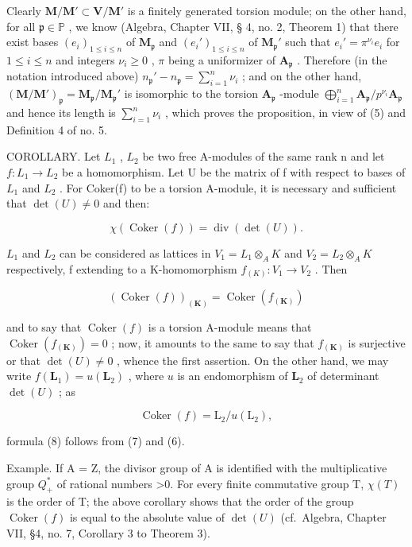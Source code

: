 Clearly \(\mathbf{M} / \mathbf{M}' \subset \mathbf{V} / \mathbf{M}'\) is a finitely generated torsion module; on the other hand, for all \(\mathfrak{p} \in \mathbb{P}\) , we know (Algebra, Chapter VII, § 4, no. 2, Theorem 1) that there exist bases \((e_i)_{1 \leqslant i \leqslant n}\) of \(\mathbf{M}_{\mathfrak{p}}\) and \((e_i')_{1 \leqslant i \leqslant n}\) of \(\mathbf{M}_{\mathfrak{p}}'\) such that \(e_i' = \pi^{\nu_i} e_i\) for \(1 \leqslant i \leqslant n\) and integers \(\nu_i \geqslant 0\) , \(\pi\) being a uniformizer of \(\mathbf{A}_{\mathfrak{p}}\) . Therefore (in the notation introduced above) \(n_{\mathfrak{p}}' - n_{\mathfrak{p}} = \sum_{i=1}^{n} \nu_i\) ; and on the other hand, \((\mathbf{M} / \mathbf{M}')_{\mathfrak{p}} = \mathbf{M}_{\mathfrak{p}} / \mathbf{M}_{\mathfrak{p}}'\) is isomorphic to the torsion \(\mathbf{A}_{\mathfrak{p}}\) -module \(\bigoplus_{i=1}^{n} \mathbf{A}_{\mathfrak{p}} / p^{\nu_i} \mathbf{A}_{\mathfrak{p}}\) and hence its length is \(\sum_{i=1}^{n} \nu_i\) , which proves the proposition, in view of (5) and Definition 4 of no. 5.

COROLLARY. Let \(L_{1}\) , \(L_{2}\) be two free A-modules of the same rank n and let \(f: L_{1} \to L_{2}\) be a homomorphism. Let U be the matrix of f with respect to bases of \(L_{1}\) and \(L_{2}\) . For Coker(f) to be a torsion A-module, it is necessary and sufficient that \(\det(U) \neq 0\) and then:

\[
\chi (\operatorname{Coker} (f)) = \operatorname{div} (\det (U)).\tag{8}
\]

\(L_{1}\) and \(L_{2}\) can be considered as lattices in \(V_{1} = L_{1} \otimes_{A} K\) and \(V_{2} = L_{2} \otimes_{A} K\) respectively, f extending to a K-homomorphism \(f_{(K)}: V_{1} \to V_{2}\) . Then

\[
\left(\operatorname{Coker} (f)\right) _ {(\mathbf {K})} = \operatorname{Coker} \left(f _ {(\mathbf {K})}\right)
\]

and to say that \(\operatorname{Coker}(f)\) is a torsion A-module means that \(\operatorname{Coker}(f_{(\mathbf{K})}) = 0\) ; now, it amounts to the same to say that \(f_{(\mathbf{K})}\) is surjective or that \(\det(U) \neq 0\) , whence the first assertion. On the other hand, we may write \(f(\mathbf{L}_1) = u(\mathbf{L}_2)\) , where \(u\) is an endomorphism of \(\mathbf{L}_2\) of determinant \(\det(U)\) ; as

\[
\operatorname{Coker} (f) = \mathrm{L} _ {2} / u (\mathrm{L} _ {2}),
\]

formula (8) follows from (7) and (6).

Example. If A = Z, the divisor group of A is identified with the multiplicative group \(Q_{+}^{*}\) of rational numbers \textgreater0. For every finite commutative group T, \(\chi(T)\) is the order of T; the above corollary shows that the order of the group \(\operatorname{Coker}(f)\) is equal to the absolute value of \(\det(U)\) (cf.~Algebra, Chapter VII, §4, no. 7, Corollary 3 to Theorem 3).
